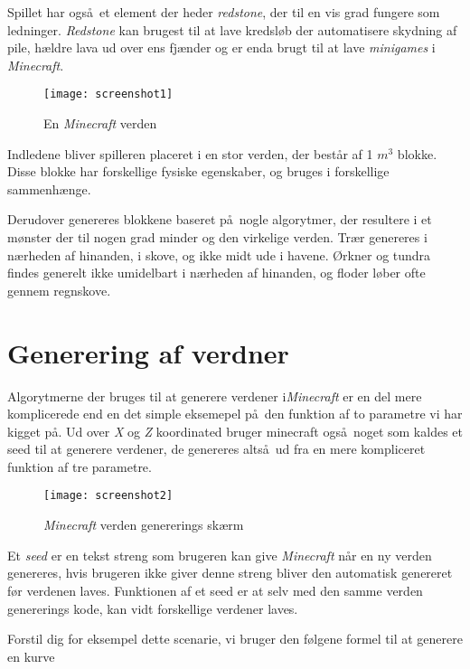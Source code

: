 \documentclass[a4paper,12pt]{report}
\begin{document}
		Spillet har ogs\aa \ et element der heder \emph{redstone}, der til en vis grad fungere som ledninger.
		\emph{Redstone} kan brugest til at lave kredsl\o b der automatisere skydning af pile, h\ae ldre lava
		ud over ens fj\ae nder og er enda brugt til at lave \emph{minigames} i \emph{Minecraft}.

		\begin{figure}
			\texttt{[image: screenshot1]}
			\caption{En \emph{Minecraft} verden}
		\end{figure}

		Indledene bliver spilleren placeret i en stor verden, der best\aa r af 1 \(m^3\) blokke. Disse blokke har forskellige fysiske egenskaber,
		og bruges i forskellige sammenh\ae nge.

		Derudover genereres blokkene baseret p\aa \ nogle algorytmer, der resultere i et m\o nster der til nogen grad minder
		og den virkelige verden. Tr\ae r genereres i n\ae rheden af hinanden, i skove, og ikke midt ude i havene.
		\O rkner og tundra findes generelt ikke umidelbart i n\ae rheden af hinanden, og floder l\o ber ofte gennem regnskove. 
	\section{Generering af verdner}
		Algorytmerne der bruges til at generere verdener i\emph{Minecraft} er en del mere komplicerede end en det simple eksemepel p\aa \ den funktion
		af to parametre vi har kigget p\aa . Ud over \emph{X} og \emph{Z} koordinated bruger minecraft ogs\aa \ noget som kaldes et seed til at generere
		verdener, de genereres alts\aa \ ud fra en mere kompliceret funktion af tre parametre.
		
		\begin{wrapfigure}{r}{0.5\textwidth}
			\texttt{[image: screenshot2]}
			\caption{\emph{Minecraft} verden genererings sk\ae rm}
		\end{wrapfigure}

		Et \emph{seed} er en tekst streng som brugeren kan give \emph{Minecraft} n\aa r en ny verden genereres, hvis brugeren ikke giver denne streng
		bliver den automatisk genereret f\o r verdenen laves. Funktionen af et seed er at selv med den samme verden genererings kode,
		kan vidt forskellige verdener laves.

		Forstil dig for eksempel dette scenarie, vi bruger den f\o lgene formel til at generere en kurve
\end{document}
